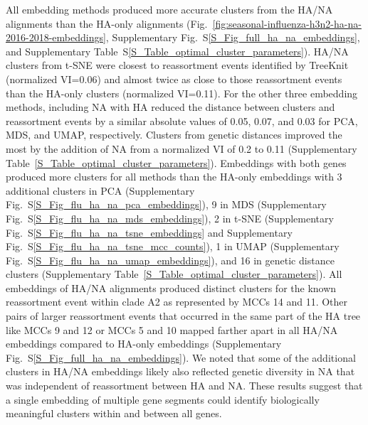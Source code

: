 \documentclass[webpdf,contemporary,large,single]{oup-authoring-template}%
\theoremstyle{thmstyleone}%
\theoremstyle{thmstyletwo}%
\theoremstyle{thmstylethree}%
\begin{document}
All embedding methods produced more accurate clusters from the HA/NA alignments than the HA-only alignments (Fig.~\ref{fig:seasonal-influenza-h3n2-ha-na-2016-2018-embeddings}, Supplementary Fig.~S\ref{S_Fig_full_ha_na_embeddings}, and Supplementary Table~S\ref{S_Table_optimal_cluster_parameters}).
HA/NA clusters from t-SNE were closest to reassortment events identified by TreeKnit (normalized VI=0.06) and almost twice as close to those reassortment events than the HA-only clusters (normalized VI=0.11).
For the other three embedding methods, including NA with HA reduced the distance between clusters and reassortment events by a similar absolute values of 0.05, 0.07, and 0.03 for PCA, MDS, and UMAP, respectively.
Clusters from genetic distances improved the most by the addition of NA from a normalized VI of 0.2 to 0.11 (Supplementary Table~\ref{S_Table_optimal_cluster_parameters}).
Embeddings with both genes produced more clusters for all methods than the HA-only embeddings with 3 additional clusters in PCA (Supplementary Fig.~S\ref{S_Fig_flu_ha_na_pca_embeddings}), 9 in MDS (Supplementary Fig.~S\ref{S_Fig_flu_ha_na_mds_embeddings}), 2 in t-SNE (Supplementary Fig.~S\ref{S_Fig_flu_ha_na_tsne_embeddings} and Supplementary Fig.~S\ref{S_Fig_flu_ha_na_tsne_mcc_counts}), 1 in UMAP (Supplementary Fig.~S\ref{S_Fig_flu_ha_na_umap_embeddings}), and 16 in genetic distance clusters (Supplementary Table~\ref{S_Table_optimal_cluster_parameters}).
All embeddings of HA/NA alignments produced distinct clusters for the known reassortment event within clade A2 \citep{Potter2019} as represented by MCCs 14 and 11.
Other pairs of larger reassortment events that occurred in the same part of the HA tree like MCCs 9 and 12 or MCCs 5 and 10 mapped farther apart in all HA/NA embeddings compared to HA-only embeddings (Supplementary Fig.~S\ref{S_Fig_full_ha_na_embeddings}).
We noted that some of the additional clusters in HA/NA embeddings likely also reflected genetic diversity in NA that was independent of reassortment between HA and NA.
These results suggest that a single embedding of multiple gene segments could identify biologically meaningful clusters within and between all genes.
\end{document}
